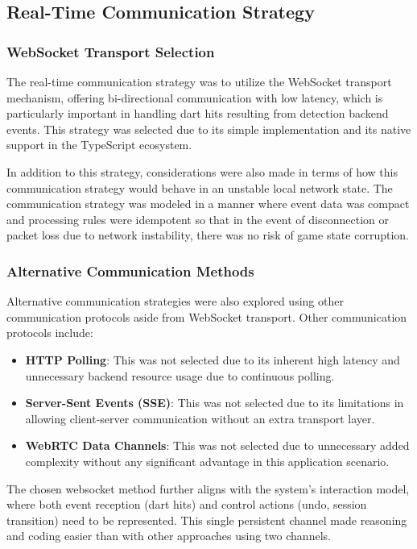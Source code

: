 \subsection{Real-Time Communication Strategy}

\subsubsection{WebSocket Transport Selection}
The real-time communication strategy was to utilize the WebSocket transport mechanism, offering bi-directional communication with low latency, which is particularly important in handling dart hits resulting from detection backend events. This strategy was selected due to its simple implementation and its native support in the TypeScript ecosystem.

In addition to this strategy, considerations were also made in terms of how this communication strategy would behave in an unstable local network state. The communication strategy was modeled in a manner where event data was compact and processing rules were idempotent so that in the event of disconnection or packet loss due to network instability, there was no risk of game state corruption.

\subsubsection{Alternative Communication Methods}
Alternative communication strategies were also explored using other communication protocols aside from WebSocket transport. Other communication protocols include:
\begin{itemize}
	\item \textbf{HTTP Polling}: This was not selected due to its inherent high latency and unnecessary backend resource usage due to continuous polling.
	\item \textbf{Server-Sent Events (SSE)}: This was not selected due to its limitations in allowing client-server communication without an extra transport layer.
	\item \textbf{WebRTC Data Channels}: This was not selected due to unnecessary added complexity without any significant advantage in this application scenario.

\end{itemize}

The chosen websocket method further aligns with the system's interaction model, where both event reception (dart hits) and control actions (undo, session transition) need to be represented. This single persistent channel made reasoning and coding easier than with other approaches using two channels.

